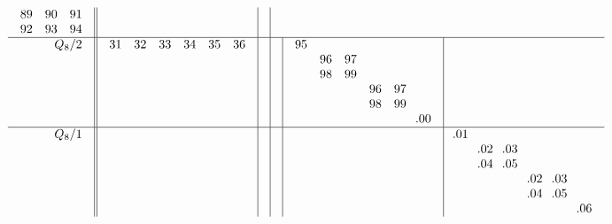\documentclass[12pt,a4paper]{amsart}
\begin{document}
\begin{align*}
\begin{array}{r||c|c|c|c|c}
\begin{array}{ccc}
      89&90&91\\
      92&93&94\\
    \end{array}
&& \\ \hline
    \begin{array}{r}
      Q_8/2 \\ \\ \\ \\ \\ \\
    \end{array}
&
  \begin{array}{cccccc}
31&32&33&34&35&36\\
&&&&&\\
&&&&&\\
&&&&&\\
&&&&&\\
&&&&&\\
  \end{array}
&&&
  \begin{array}{cccccc}
95&&&&&\\
&96&97&&&\\
&98&99&&&\\
&&&96&97&\\
&&&98&99&\\
&&&&&\llap.00\\
  \end{array}
& \\ \hline
    \begin{array}{r}
      Q_8/1 \\ \\ \\ \\ \\ \\
    \end{array}
&&&&&
      \begin{array}{cccccc}
\llap.01&&&&&\\
&\llap.02&\llap.03&&&\\
&\llap.04&\llap.05&&&\\
&&&\llap.02&\llap.03&\\
&&&\llap.04&\llap.05&\\
&&&&&\llap.06\\
      \end{array}
  \end{array}
\end{align*}
\end{document}
